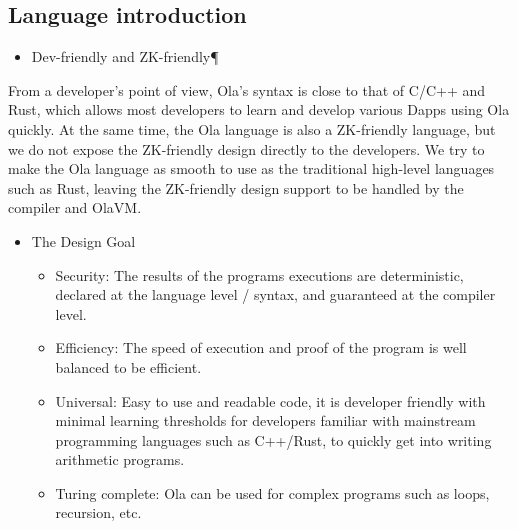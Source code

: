 \subsection{Language introduction}\label{section: ola-lang-language-introduction}

\begin{itemize}
    \item Dev-friendly and ZK-friendly¶
\end{itemize}

From a developer’s point of view, Ola’s syntax is close to that of C/C++ and Rust, which allows most developers to learn and develop various Dapps using Ola quickly.
At the same time, the Ola language is also a ZK-friendly language, but we do not expose the ZK-friendly design directly to the developers.
We try to make the Ola language as smooth to use as the traditional high-level languages such as Rust, leaving the ZK-friendly design support to be handled by the compiler and OlaVM.

\begin{itemize}
    \item The Design Goal
    \begin{itemize}
        \item Security: The results of the programs executions are deterministic, declared at the language level / syntax, and guaranteed at the compiler level.

        \item Efficiency: The speed of execution and proof of the program is well balanced to be efficient.

        \item Universal: Easy to use and readable code, it is developer friendly with minimal learning thresholds for developers familiar with mainstream programming languages such as C++/Rust, to quickly get into writing arithmetic programs.

        \item Turing complete: Ola can be used for complex programs such as loops, recursion, etc.
    \end{itemize}
\end{itemize}